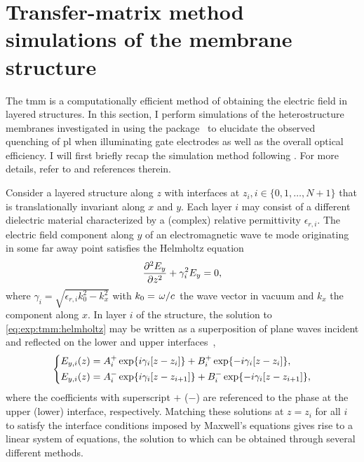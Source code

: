 \clearpage

\section{Transfer-matrix method simulations of the membrane structure}\label{sec:exp:tmm}
The \gls{tmm} is a computationally efficient method of obtaining the electric field in layered structures.
In this section, I perform simulations of the heterostructure membranes investigated in \thispart using the \pymoosh package~\cite{Langevin2024} to elucidate the observed quenching of \gls{pl} when illuminating gate electrodes as well as the overall optical efficiency.
I will first briefly recap the simulation method following .
For more details, refer to \ibid and references therein.

Consider a layered structure along $z$ with interfaces at $z_i, i\in\lbrace 0, 1, \dotsc, N+1\rbrace$ that is translationally invariant along $x$ and $y$.
Each layer $i$ may consist of a different dielectric material characterized by a (complex) relative permittivity $\epsilon_{r,i}$.
The electric field component along $y$ of an electromagnetic wave \gls{te} mode originating in some far away point satisfies the Helmholtz equation
\begin{equation}\label{eq:exp:tmm:helmholtz}
    \pdv[2]{E_y}{z} + \gamma_i^2 E_y = 0,
\end{equation}
where $\gamma_i = \sqrt{\epsilon_{r,i}k_0^2 - k_x^2}$ with $k_0=\flatfrac{\omega}{c}$ the wave vector in vacuum and $k_x$ the component along $x$.
In layer $i$ of the structure, the solution to \cref{eq:exp:tmm:helmholtz} may be written as a superposition of plane waves incident and reflected on the lower and upper interfaces~\cite{Langevin2024},
\begin{equation}\label{eq:exp:tmm:fields}
    \begin{dcases}
        E_{y,i}(z) = A_i^{+}\exp{\ensuremath{i}\gamma_i[z-z_{i}]} + B_i^{+}\exp{-\ensuremath{i}\gamma_i[z-z_{i}]}, \\
        E_{y,i}(z) = A_i^{-}\exp{\ensuremath{i}\gamma_i[z-z_{i+1}]} + B_i^{-}\exp{-\ensuremath{i}\gamma_i[z-z_{i+1}]},
    \end{dcases}
\end{equation}
where the coefficients with superscript $+$ ($-$) are referenced to the phase at the upper (lower) interface, respectively.
Matching these solutions at $z=z_i$ for all $i$ to satisfy the interface conditions imposed by Maxwell's equations gives rise to a linear system of equations, the solution to which can be obtained through several different methods.

